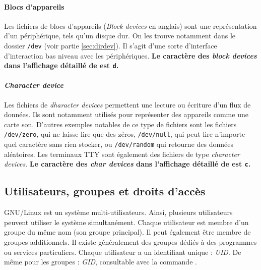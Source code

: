 \paragraph{Blocs d'appareils} \label{sec:file_dev}
Les fichiers de blocs d'appareils (\textit{Block devices} en anglais) sont une représentation d'un périphérique, tels qu'un disque dur. On les trouve notamment dans le dossier \texttt{/dev} (voir partie \ref{sec:dirdev}). Il s'agit d'une sorte d'interface d'interaction bas niveau avec les périphériques. \newline
\textbf{Le caractère des \textit{block devices} dans l'affichage détaillé de  est \texttt{d}.}

\paragraph{\textit{Character device}} \label{sec:file_char}
Les fichiers de \textit{dharacter devices} permettent une lecture ou écriture d'un flux de données. Ils sont notamment utilisés pour représenter des appareils comme une carte son. D'autres exemples notables de ce type de fichiers sont les fichiers \texttt{/dev/zero}, qui ne laisse lire que des zéros, \texttt{/dev/null}, qui peut lire n'importe quel caractère sans rien stocker, ou \texttt{/dev/random} qui retourne des données aléatoires. Les terminaux TTY sont également des fichiers de type \textit{character devices}.  \newline
\textbf{Le caractère des \textit{char devices} dans l'affichage détaillé de  est \texttt{c}.}

\subsection{Utilisateurs, groupes et droits d'accès} \label{sec:users}
\vspace{-2mm}
GNU/Linux est un système multi-utilisateurs. Ainsi, plusieurs utilisateurs peuvent utiliser le système simultanément. Chaque utilisateur est membre d'un groupe du même nom (son groupe principal). Il peut également être membre de groupes additionnels. Il existe généralement des groupes dédiés à des programmes ou services particuliers. Chaque utilisateur a un identifiant unique : \textit{UID}. De même pour les groupes : \textit{GID}, consultable avec la commande .

